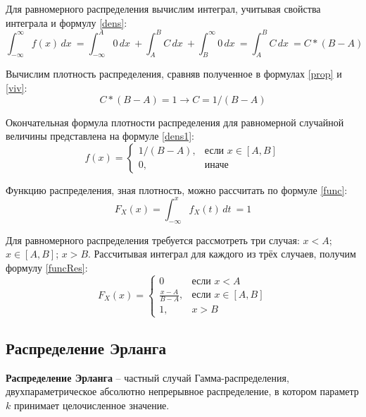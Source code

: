 Для равномерного распределения вычислим интеграл, учитывая свойства интеграла и формулу \ref{dens}:
\begin{equation}
	\label{viv}
	\int_{-\infty}^{\infty} f(x) \,dx \ = \int_{-\infty}^{A} 0 \,dx \ + \int_{A}^{B} C \,dx \ + \int_{B}^{\infty} 0 \,dx \ = \int_{A}^{B} C \,dx \ = C*(B - A)
\end{equation}

Вычислим плотность распределения, сравняв полученное в формулах \ref{prop} и \ref{viv}:
\begin{equation}
	\label{vivProb}
	C*(B - A) = 1 \rightarrow C = 1 / (B - A)
\end{equation}

Окончательная формула плотности распределения для равномерной случайной величины представлена на формуле \ref{dens1}:
\begin{equation}
	\label{dens1}
	f(x)= 
	\begin{cases}
		1 / (B - A),& \text{если } x \in [A, B]\\
		0,              & \text{иначе}
	\end{cases}
\end{equation}

Функцию распределения, зная плотность, можно рассчитать по формуле \ref{func}:
\begin{equation}
	\label{func}
	F_X(x) = \int_{-\infty}^{x} f_X(t) \,dt \ = 1
\end{equation}

\newpage
Для равномерного распределения требуется рассмотреть три случая: $x < A$; $x \in [A, B]$; $x > B$. Рассчитывая интеграл для каждого из трёх случаев, получим формулу \ref{funcRes}:
\begin{equation}
	\label{funcRes}
	F_X(x)= 
	\begin{cases}
		0 & \text{если } x < A\\
		\frac{x - A}{B - A},& \text{если } x \in [A, B]\\
		1,              & x > B
	\end{cases}
\end{equation}

\subsection*{Распределение Эрланга}
\textbf{Распределение Эрланга} -- частный случай Гамма-распределения, двухпараметрическое абсолютно непрерывное распределение, в котором параметр $k$ принимает целочисленное значение.

